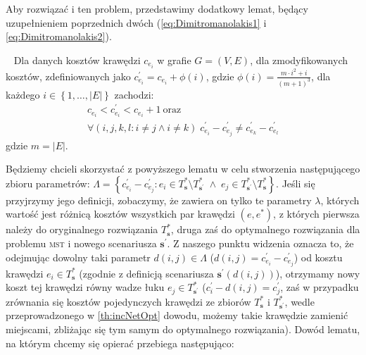 Aby rozwiązać i ten problem, przedstawimy dodatkowy lemat, będący uzupełnieniem poprzednich dwóch (\ref{eq:Dimitromanolakis1} i \ref{eq:Dimitromanolakis2}).

\begin{lemma}~\cite{Dimitromanolakis02analysisof}\label{lm:Dimitromanolakis}
Dla danych kosztów krawędzi $c_{e_{i}}$ w grafie $G = \left( V, E \right)$, dla zmodyfikowanych kosztów, zdefiniowanych jako $c^{\prime}_{e_{i}} = c_{e_{i}} + \phi \left( i \right)$, gdzie $\phi \left( i \right) = \frac{m \cdot i^{2} + i}{\left( m + 1 \right)^{3}}$, dla każdego $i \in \left\{ 1, \dots, \left| E \right| \right\}$ zachodzi:
\begin{gather}
	c_{e_{i}} < c^{\prime}_{e_{i}} < c_{e_{i}} + 1~\text{oraz}\label{eq:Dimitromanolakis3}\\
	\forall \left( i, j, k, l : i \neq j \wedge i \neq k \right) \; c^{\prime}_{e_{i}} - c^{\prime}_{e_{j}} \neq c^{\prime}_{e_{k}} - c^{\prime}_{e_{l}}\label{eq:Dimitromanolakis4}
\end{gather}
gdzie $m = \left| E \right|$.
\end{lemma}

Będziemy chcieli skorzystać z powyższego lematu w celu stworzenia następującego zbioru parametrów: $\Lambda = \left\{ c^{\prime}_{e_{i}} - c^{\prime}_{e_{j}} : e_{i} \in T^{\ast}_{\textbf{s}} \setminus T^{\ast}_{\textbf{s}^{\prime}} \; \wedge \; e_{j} \in T^{\ast}_{\textbf{s}^{\prime}} \setminus T^{\ast}_{\textbf{s}} \right\}$. Jeśli się przyjrzymy jego definicji, zobaczymy, że zawiera on tylko te parametry $\lambda$, których wartość jest różnicą kosztów wszystkich par krawędzi $\left( e, e^{\ast} \right)$, z których pierwsza należy do oryginalnego rozwiązania $T^{\ast}_{\textbf{s}}$, druga zaś do optymalnego rozwiązania dla problemu \textsc{mst} i nowego scenariusza $\textbf{s}^{\prime}$. Z naszego punktu widzenia oznacza to, że odejmując dowolny taki parametr $d \left( i, j \right) \in \Lambda$ ($d \left( i, j \right) = c^{\prime}_{e_{i}} - c^{\prime}_{e_{j}}$) od kosztu krawędzi $e_{i} \in T^{\ast}_{\textbf{s}}$ (zgodnie z definicją scenariusza $\textbf{s}^{\prime} \left( d \left( i, j \right) \right)$), otrzymamy nowy koszt tej krawędzi równy wadze łuku $e_{j} \in T^{\ast}_{\textbf{s}^{\prime}}$ ($c^{\prime}_{i} - d \left( i, j \right) = c^{\prime}_{j}$, zaś w przypadku zrównania się kosztów pojedynczych krawędzi ze zbiorów $T^{\ast}_{\textbf{s}}$ i $T^{\ast}_{\textbf{s}^{\prime}}$, wedle przeprowadzonego w \ref{th:incNetOpt} dowodu, możemy takie krawędzie zamienić miejscami, zbliżając się tym samym do optymalnego rozwiązania). Dowód lematu, na którym chcemy się opierać przebiega następująco:


